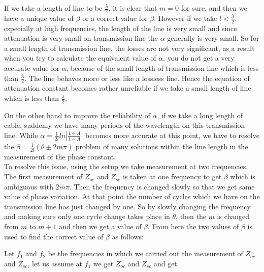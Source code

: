 If we take a length of line to be $\frac{\lambda}{2}$, it is clear that $m = 0$ for sure, and then we have a unique value of $\beta$ or a correct value for $\beta$. However if we take $l < \frac{\lambda}{2}$, especially at high frequencies, the length of the line is very small and since attenuation is very small on transmission line the $\alpha$ generally is very small. So for a small length of transmission line, the losses are not very significant, as a result when you try to calculate the equivalent value of $\alpha$, you do not get a very accurate value for $\alpha$, because of the small length of transmission line which is less than $\frac{\lambda}{2}$. The line behaves more or less like a lossless line. Hence the equation of attenuation constant becomes rather unreliable if we take a small length of line which is less than $\frac{\lambda}{2}$.

On the other hand to improve the reliability of $\alpha$, if we take a long length of cable, suddenly we have many periods of the wavelength on this transmission line. While $\alpha = \frac{1}{2l}ln|\frac{1 + A}{1 - A}|$ becomes more accurate at this point, we have to resolve the $\beta = \frac{1}{2l} (\theta \pm 2m\pi)$ problem of many solutions within the line length in the measurement of the phase constant.\\

To resolve this issue, using the setup we take measurement at two frequencies. The first measurement of $Z_{oc}$ and $Z_{sc}$ is taken at one frequency  to get $\beta$ which is ambiguous with $2m\pi$. Then the frequency is changed slowly so that we get same value of phase variation. At  that point the number of cycles which we have on the transmission line has just changed by one. So by slowly changing the frequency and making sure only one cycle change takes place in $\theta$, then the $m$ is changed from $m$ to $m + 1$ and then we get a value of $\beta$. From here the two values of $\beta$ is used to find the correct value of $\beta$ as  follows:

Let $f_1$ and $f_2$ be the frequencies in which we carried out the measurement of  $Z_{oc}$ and $Z_{sc}$, let us assume at $f_1$ we get  $Z_{oc}$ and $Z_{sc}$ and get


